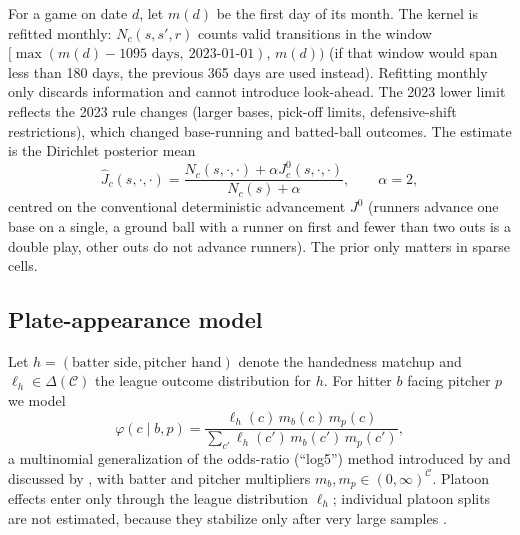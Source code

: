 \documentclass[11pt]{article}
\theoremstyle{definition}
\theoremstyle{remark}
\newcommand{\cC}{\mathcal{C}}
\begin{document}
For a game on date $d$, let $m(d)$ be the first day of its month. The kernel is refitted monthly:
$N_c(s,s',r)$ counts valid transitions in the window
$[\max(m(d)-1095\text{ days},\ \text{2023-01-01}),\,m(d))$ (if that window would span less than
180 days, the previous 365 days are used instead). Refitting monthly only discards information and
cannot introduce look-ahead. The 2023 lower limit reflects the 2023 rule
changes (larger bases, pick-off limits, defensive-shift restrictions), which changed base-running
and batted-ball outcomes. The estimate is the Dirichlet posterior mean
\[
\hat J_c(s,\cdot,\cdot)=\frac{N_c(s,\cdot,\cdot)+\alpha J^0_c(s,\cdot,\cdot)}{N_c(s)+\alpha},
\qquad \alpha=2,
\]
centred on the conventional deterministic advancement $J^0$ (runners advance one base on a
single, a ground ball with a runner on first and fewer than two outs is a double play, other outs
do not advance runners). The prior only matters in sparse cells.

\subsection{Plate-appearance model}

Let $h=(\text{batter side},\text{pitcher hand})$ denote the handedness matchup and
$\ell_h\in\Delta(\cC)$ the league outcome distribution for $h$. For hitter $b$ facing pitcher $p$
we model
\begin{equation}\label{eq:log5}
\varphi(c\mid b,p)=\frac{\ell_h(c)\,m_b(c)\,m_p(c)}{\sum_{c'}\ell_h(c')\,m_b(c')\,m_p(c')},
\end{equation}
a multinomial generalization of the odds-ratio (``log5'') method introduced by
\citet{james1981} and discussed by \citet{tango2007}, with batter
and pitcher multipliers $m_b,m_p\in(0,\infty)^{\cC}$. Platoon effects enter only through the
league distribution $\ell_h$; individual platoon splits are not estimated, because they stabilize
only after very large samples \cite{tango2007}.
\end{document}
